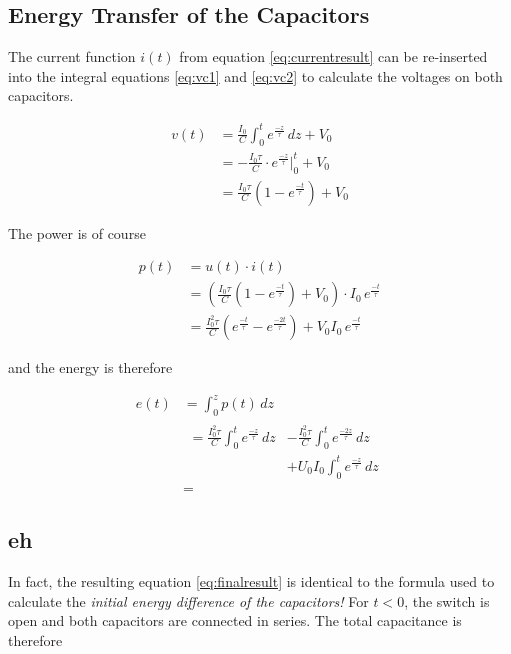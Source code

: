 \subsection{Energy Transfer of the Capacitors}

The  current function  $i(t)$  from  equation  \ref{eq:currentresult}  can  be
re-inserted  into  the integral equations  \ref{eq:vc1}  and  \ref{eq:vc2}  to
calculate the voltages on both capacitors.

\begin{align}
    v(t) &= \frac{I_0}{C} \int_0^t e^\frac{-z}{\tau}\,dz + V_0\\
         &= -\frac{I_0\tau}{C} \cdot e^\frac{-z}{\tau} \bigg|_0^t + V_0 \\
         &= \frac{I_0\tau}{C}\left(1-e^\frac{-t}{\tau}\right) + V_0
\end{align}

The power is of course

\begin{align}
    p(t) &= u(t)\cdot i(t) \\
         &= \left( \frac{I_0\tau}{C}\left(1 - e^\frac{-t}{\tau}\right) + V_0 \right) \cdot I_0\,e^\frac{-t}{\tau} \\
         &= \frac{I_0^2\tau}{C}\left(e^\frac{-t}{\tau}-e^\frac{-2t}{\tau}\right) + V_0I_0\,e^\frac{-t}{\tau}
\end{align}

and the energy is therefore

\begin{align}
    e(t) &= \int_0^z p(t)\,dz \\
         & \begin{aligned}
            = \frac{I_0^2\tau}{C}\int_0^t e^\frac{-z}{\tau}\,dz &- \frac{I_0^2\tau}{C}\int_0^t e^\frac{-2z}{\tau}\,dz \\
                                                               &+ U_0I_0\int_0^t e^\frac{-z}{\tau}\,dz
        \end{aligned} \\
         &= 
\end{align}

\subsection{eh}

In fact, the resulting equation \ref{eq:finalresult} is identical to the formula used to calculate the \textit{initial energy difference of the capacitors!} For $t<0$, the switch is open and both capacitors are connected in series. The total capacitance is therefore

